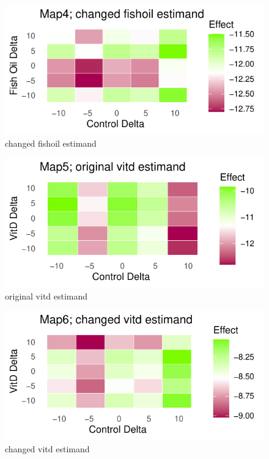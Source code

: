 \documentclass{article}
\newcommand{\pandocbounded}[1]{#1}
\begin{document}
\begin{figure}
\centering
\pandocbounded{\includegraphics[keepaspectratio]{Final_Report_files/figure-latex/unnamed-chunk-41-1.pdf}}
\caption{changed fishoil estimand}
\end{figure}

\begin{figure}
\centering
\pandocbounded{\includegraphics[keepaspectratio]{Final_Report_files/figure-latex/unnamed-chunk-42-1.pdf}}
\caption{original vitd estimand}
\end{figure}

\begin{figure}
\centering
\pandocbounded{\includegraphics[keepaspectratio]{Final_Report_files/figure-latex/unnamed-chunk-43-1.pdf}}
\caption{changed vitd estimand}
\end{figure}
\end{document}
